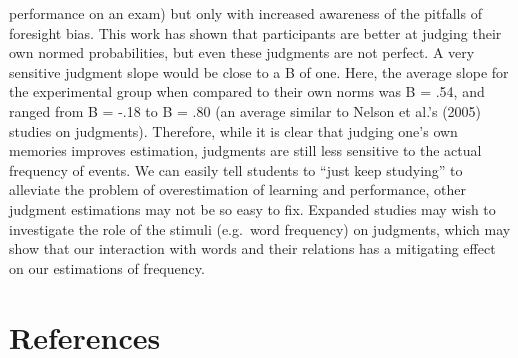 \documentclass[english,man]{apa6}
\theoremstyle{definition}
\theoremstyle{definition}
\theoremstyle{definition}
\theoremstyle{remark}
\begin{document}
performance on an exam) but only with increased awareness of the
pitfalls of foresight bias. This work has shown that participants are
better at judging their own normed probabilities, but even these
judgments are not perfect. A very sensitive judgment slope would be
close to a B of one. Here, the average slope for the experimental group
when compared to their own norms was B = .54, and ranged from B = -.18
to B = .80 (an average similar to Nelson et al.'s (2005) studies on
judgments). Therefore, while it is clear that judging one's own memories
improves estimation, judgments are still less sensitive to the actual
frequency of events. We can easily tell students to \enquote{just keep
studying} to alleviate the problem of overestimation of learning and
performance, other judgment estimations may not be so easy to fix.
Expanded studies may wish to investigate the role of the stimuli
(e.g.~word frequency) on judgments, which may show that our interaction
with words and their relations has a mitigating effect on our
estimations of frequency.

\newpage

\section{References}\label{references}

\setlength{\parindent}{-0.5in} \setlength{\leftskip}{0.5in}
\end{document}
